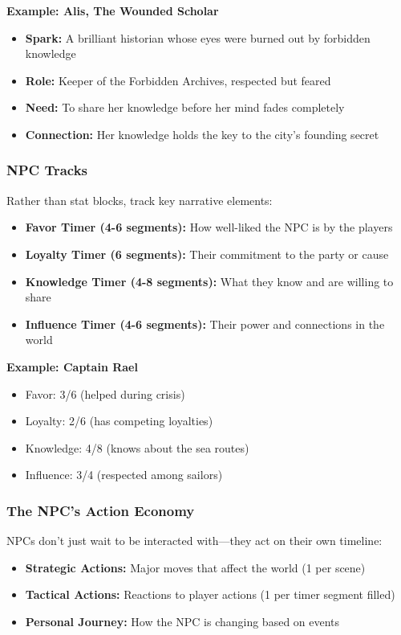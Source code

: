\documentclass[10pt]{article}
\begin{document}
\textbf{Example: Alis, The Wounded Scholar}
\begin{itemize}
  \item \textbf{Spark:} A brilliant historian whose eyes were burned out by forbidden knowledge
  \item \textbf{Role:} Keeper of the Forbidden Archives, respected but feared
  \item \textbf{Need:} To share her knowledge before her mind fades completely
  \item \textbf{Connection:} Her knowledge holds the key to the city's founding secret
\end{itemize}

\subsubsection{NPC Tracks}

Rather than stat blocks, track key narrative elements:

\begin{itemize}
  \item \textbf{Favor Timer (4-6 segments):} How well-liked the NPC is by the players
  \item \textbf{Loyalty Timer (6 segments):} Their commitment to the party or cause
  \item \textbf{Knowledge Timer (4-8 segments):} What they know and are willing to share
  \item \textbf{Influence Timer (4-6 segments):} Their power and connections in the world
\end{itemize}

\textbf{Example: Captain Rael}
\begin{itemize}
  \item Favor: 3/6 (helped during crisis)
  \item Loyalty: 2/6 (has competing loyalties)
  \item Knowledge: 4/8 (knows about the sea routes)
  \item Influence: 3/4 (respected among sailors)
\end{itemize}

\subsubsection{The NPC's Action Economy}

NPCs don't just wait to be interacted with---they act on their own timeline:

\begin{itemize}
  \item \textbf{Strategic Actions:} Major moves that affect the world (1 per scene)
  \item \textbf{Tactical Actions:} Reactions to player actions (1 per timer segment filled)
  \item \textbf{Personal Journey:} How the NPC is changing based on events
\end{itemize}
\end{document}
